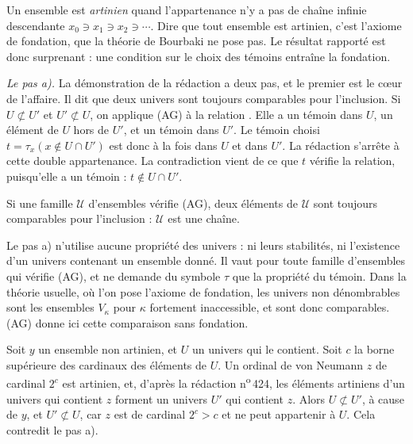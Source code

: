 \noindent Un ensemble est \emph{artinien} quand l'appartenance n'y a pas de chaîne infinie descendante $x_0 \ni x_1 \ni x_2 \ni \cdots$. Dire que tout ensemble est artinien, c'est l'axiome de fondation, que la théorie de Bourbaki ne pose pas. Le résultat rapporté est donc surprenant : une condition sur le choix des témoins entraîne la fondation.

\emph{Le pas a).} La démonstration de la rédaction a deux pas, et le premier est le cœur de l'affaire. Il dit que deux univers sont toujours comparables pour l'inclusion. Si $U \not\subset U'$ et $U' \not\subset U$, on applique (AG) à la relation . Elle a un témoin dans $U$, un élément de $U$ hors de $U'$, et un témoin dans $U'$. Le témoin choisi $t = \tau_x(x \notin U \cap U')$ est donc à la fois dans $U$ et dans $U'$. La rédaction s'arrête à cette double appartenance. La contradiction vient de ce que $t$ vérifie la relation, puisqu'elle a un témoin : $t \notin U \cap U'$.

\begin{encadre}
\begin{enonce}
Si une famille $\mathcal U$ d'ensembles vérifie (AG), deux éléments de $\mathcal U$ sont toujours comparables pour l'inclusion : $\mathcal U$ est une chaîne.
\end{enonce}
\end{encadre}

\begin{remarque}
Le pas a) n'utilise aucune propriété des univers : ni leurs stabilités, ni l'existence d'un univers contenant un ensemble donné. Il vaut pour toute famille d'ensembles qui vérifie (AG), et ne demande du symbole $\tau$ que la propriété du témoin. Dans la théorie usuelle, où l'on pose l'axiome de fondation, les univers non dénombrables sont les ensembles $V_\kappa$ pour $\kappa$ fortement inaccessible, et sont donc comparables. (AG) donne ici cette comparaison sans fondation.
\end{remarque}

\begin{demopage}[pas b)]
Soit $y$ un ensemble non artinien, et $U$ un univers qui le contient. Soit $c$ la borne supérieure des cardinaux des éléments de $U$. Un ordinal de von Neumann $z$ de cardinal $2^c$ est artinien, et, d'après la rédaction n\textsuperscript{o}\,424, les éléments artiniens d'un univers qui contient $z$ forment un univers $U'$ qui contient $z$. Alors $U \not\subset U'$, à cause de $y$, et $U' \not\subset U$, car $z$ est de cardinal $2^c > c$ et ne peut appartenir à $U$. Cela contredit le pas a).
\end{demopage}

